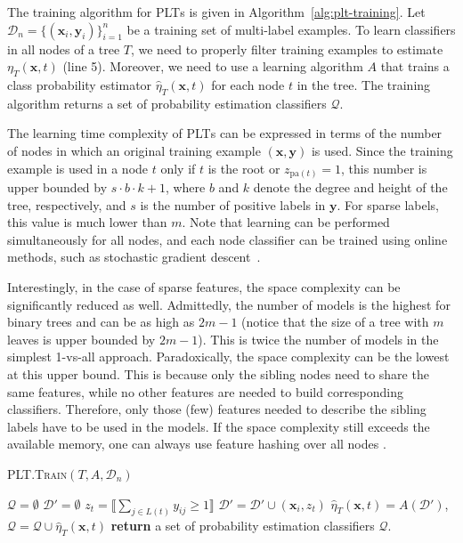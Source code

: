 \documentclass{article}
\newcommand{\Algo}[1]{\textsc{#1}}
\renewcommand{\vec}[1]{\boldsymbol{#1}}
\newcommand{\bx}{\vec{x}}
\newcommand{\by}{\vec{y}}
\newcommand{\calD}{\mathcal{D}}
\newcommand{\heta}{\hat{\eta}}
\newcommand{\pa}[1]{\mathrm{pa}(#1)}
\newcommand{\assert}[1]{\llbracket #1 \rrbracket}
\begin{document}
The training algorithm for \Algo{PLT}s is given in Algorithm~\ref{alg:plt-training}.
Let $\calD_n = \{ (\bx_i, \by_{i}) \}_{i=1}^n$ be a training set of multi-label examples.
To learn classifiers in all nodes of a tree $T$, we need to properly filter training examples to estimate $\eta_T(\bx,t)$ (line 5). Moreover, we need to use a learning algorithm $A$ that trains a class probability estimator $\heta_T(\bx,t)$ for each node $t$ in the tree. %
The training algorithm returns a set of probability estimation classifiers $\mathcal{Q}$.

The learning time complexity of \Algo{PLT}s can be expressed in terms of the number of nodes in which an original training example $(\bx,\by)$ is used. Since the training example is used in a node $t$ only if $t$ is the root or $z_{\pa{t}} = 1$, this number is upper bounded by $s\cdot b \cdot k+1$, where $b$ and $k$ denote the degree and height of the tree, respectively, and $s$ is the number of positive labels in $\by$. For sparse labels, this value is much lower than $m$. Note that learning can be performed simultaneously for all nodes, and each node classifier can be trained using online methods, such as stochastic gradient descent~\cite{Bottou_2010}.

Interestingly, in the case of sparse features, the space complexity can be significantly reduced as well. Admittedly, the number of models is the highest for binary trees and can be as high as $2m-1$ (notice that the size of a tree with $m$ leaves is upper bounded by $2m-1$). This is twice the number of models in the simplest 1-vs-all approach. Paradoxically, the space complexity can be the lowest at this upper bound. This is because only the sibling nodes need to share the same features, while no other features are needed to build corresponding classifiers. Therefore, only those (few) features needed to describe the sibling labels have to be used in the models. If the space complexity still exceeds the available memory, one can always use feature hashing over all nodes \cite{Weinberger_et_al_2009}.

%
\begin{algorithm}[t]
\caption{\Algo{PLT.Train}$(T, A, \calD_n)$}%
\label{alg:plt-training}
\begin{algorithmic}[1]
\State $\mathcal{Q} = \emptyset$
\State $\calD' = \emptyset$
\If{$t$ is \textbf{root} or $z_{\pa{t}} = 1 $}
\State $z_t = \assert{\sum_{j \in L(t)} y_{ij} \ge 1 }$
\State $\calD' = \calD' \cup (\bx_i, z_t)$ 
\EndIf
\EndFor
\State $\heta_T(\bx,t) = A(\calD')$, $\mathcal{Q} = \mathcal{Q} \cup \heta_T(\bx,t) $  
\EndFor
\State \textbf{return} a set of probability estimation classifiers $\mathcal{Q}$. 
\end{algorithmic}
\end{algorithm} 
\end{document}
